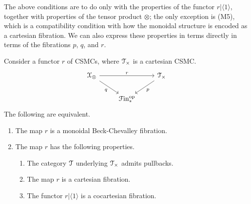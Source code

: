 \documentclass[main.tex]{subfiles}
\begin{document}
The above conditions are to do only with the properties of the functor $r|\langle 1 \rangle$, together with properties of the tensor product $\otimes$; the only exception is (M5), which is a compatibility condition with how the monoidal structure is encoded as a cartesian fibration. We can also express these properties in terms directly in terms of the fibrations $p$, $q$, and $r$.
\begin{lemma}
  \label{lemma:equivalent_conditions_beck_chevalley_fibration}
  Consider a functor $r$ of CSMCs, where $\mathcal{T}_{\times}$ is a cartesian CSMC.
  \begin{equation*}
    \begin{tikzcd}
      \category{X}_{\otimes}
      \arrow[rr, "r"]
      \arrow[dr, swap, "q"]
      && \category{T}_{\times}
      \arrow[dl, "p"]
      \\
      & \Finp\op
    \end{tikzcd}
  \end{equation*}
  The following are equivalent.
  \begin{enumerate}
    \item The map $r$ is a monoidal Beck-Chevalley fibration.

    \item The map $r$ has the following properties.
      \begin{enumerate}
        \item The category $\mathcal{T}$ underlying $\mathcal{T}_{\times}$ admits pullbacks.

        \item The map $r$ is a cartesian fibration.

        \item The functor $r|\langle 1 \rangle$ is a cocartesian fibration.


\end{enumerate}
\end{enumerate}
\end{lemma}
\end{document}

